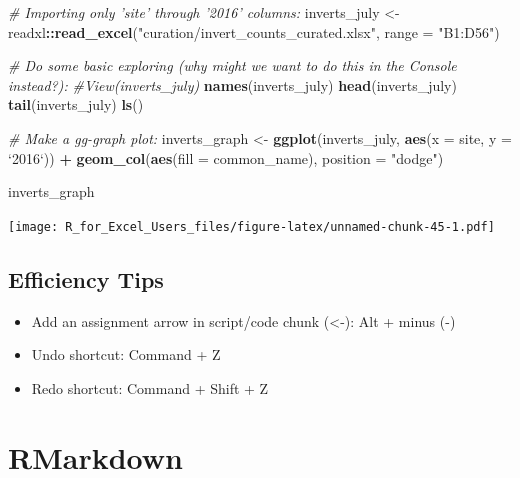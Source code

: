 \documentclass[]{book}
\newenvironment{Shaded}{\begin{snugshade}}{\end{snugshade}}
\newcommand{\CommentTok}[1]{\textcolor[rgb]{0.56,0.35,0.01}{\textit{#1}}}
\newcommand{\DataTypeTok}[1]{\textcolor[rgb]{0.13,0.29,0.53}{#1}}
\newcommand{\KeywordTok}[1]{\textcolor[rgb]{0.13,0.29,0.53}{\textbf{#1}}}
\newcommand{\NormalTok}[1]{#1}
\newcommand{\OperatorTok}[1]{\textcolor[rgb]{0.81,0.36,0.00}{\textbf{#1}}}
\newcommand{\StringTok}[1]{\textcolor[rgb]{0.31,0.60,0.02}{#1}}
\providecommand{\tightlist}{%
  \setlength{\itemsep}{0pt}\setlength{\parskip}{0pt}}
\begin{document}
\begin{Shaded}
\begin{Highlighting}[]
\CommentTok{# Importing only 'site' through '2016' columns: }
\NormalTok{inverts_july <-}\StringTok{ }\NormalTok{readxl}\OperatorTok{::}\KeywordTok{read_excel}\NormalTok{(}\StringTok{"curation/invert_counts_curated.xlsx"}\NormalTok{, }\DataTypeTok{range =} \StringTok{"B1:D56"}\NormalTok{)}

\CommentTok{# Do some basic exploring (why might we want to do this in the Console instead?):}
\CommentTok{#View(inverts_july)}
\KeywordTok{names}\NormalTok{(inverts_july)}
\KeywordTok{head}\NormalTok{(inverts_july)}
\KeywordTok{tail}\NormalTok{(inverts_july)}
\KeywordTok{ls}\NormalTok{()}

\CommentTok{# Make a gg-graph plot: }
\NormalTok{inverts_graph <-}\StringTok{ }\KeywordTok{ggplot}\NormalTok{(inverts_july, }\KeywordTok{aes}\NormalTok{(}\DataTypeTok{x =}\NormalTok{ site, }\DataTypeTok{y =} \StringTok{`}\DataTypeTok{2016}\StringTok{`}\NormalTok{)) }\OperatorTok{+}
\StringTok{  }\KeywordTok{geom_col}\NormalTok{(}\KeywordTok{aes}\NormalTok{(}\DataTypeTok{fill =}\NormalTok{ common_name), }
           \DataTypeTok{position =} \StringTok{"dodge"}\NormalTok{)}
\end{Highlighting}
\end{Shaded}

\begin{Shaded}
\begin{Highlighting}[]
\NormalTok{inverts_graph}
\end{Highlighting}
\end{Shaded}

\texttt{[image: R\_for\_Excel\_Users\_files/figure-latex/unnamed-chunk-45-1.pdf]}

\hypertarget{efficiency-tips-1}{%
\section{Efficiency Tips}\label{efficiency-tips-1}}

\begin{itemize}
\tightlist
\item
  Add an assignment arrow in script/code chunk (\textless{}-): Alt + minus (-)
\item
  Undo shortcut: Command + Z
\item
  Redo shortcut: Command + Shift + Z
\end{itemize}

\hypertarget{rmarkdown}{%
\chapter{RMarkdown}\label{rmarkdown}}
\end{document}

